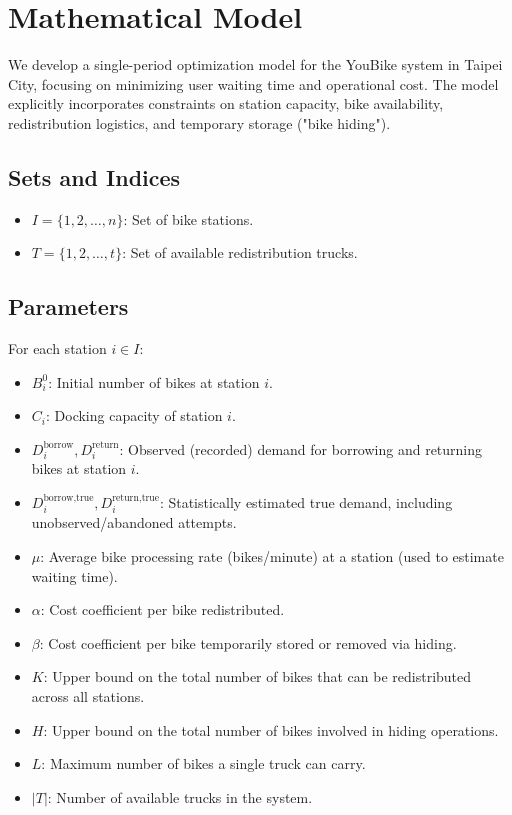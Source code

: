 \documentclass[11pt,a4paper]{article}
\begin{document}
\section{Mathematical Model}

We develop a single-period optimization model for the YouBike system in Taipei City, focusing on minimizing user waiting time and operational cost. The model explicitly incorporates constraints on station capacity, bike availability, redistribution logistics, and temporary storage ("bike hiding").

\subsection*{Sets and Indices}

\begin{itemize}
    \item $I = \{1, 2, \dots, n\}$: Set of bike stations.
    \item $T = \{1, 2, \dots, t\}$: Set of available redistribution trucks.
\end{itemize}

\subsection*{Parameters}

For each station $i \in I$:

\begin{itemize}
    \item $B_i^0$: Initial number of bikes at station $i$.
    \item $C_i$: Docking capacity of station $i$.
    \item $D_i^{\text{borrow}}, D_i^{\text{return}}$: Observed (recorded) demand for borrowing and returning bikes at station $i$.
    \item $D_i^{\text{borrow,true}}, D_i^{\text{return,true}}$: Statistically estimated true demand, including unobserved/abandoned attempts.

    \item $\mu$: Average bike processing rate (bikes/minute) at a station (used to estimate waiting time).
    \item $\alpha$: Cost coefficient per bike redistributed.
    \item $\beta$: Cost coefficient per bike temporarily stored or removed via hiding.
    \item $K$: Upper bound on the total number of bikes that can be redistributed across all stations.
    \item $H$: Upper bound on the total number of bikes involved in hiding operations.
    \item $L$: Maximum number of bikes a single truck can carry.
    \item $|T|$: Number of available trucks in the system.
\end{itemize}
\end{document}
